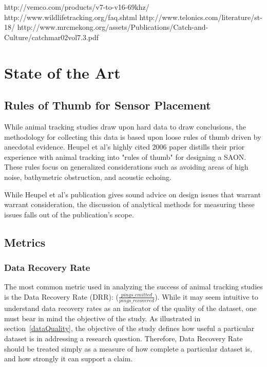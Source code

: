 http://vemco.com/products/v7-to-v16-69khz/
http://www.wildlifetracking.org/faq.shtml
http://www.telonics.com/literature/st-18/
http://www.mrcmekong.org/assets/Publications/Catch-and-Culture/catchmar02vol7.3.pdf










\section{State of the Art}

\subsection{Rules of Thumb for Sensor Placement}
\label{RulesOfThumb}
While animal tracking studies draw upon hard data to draw conclusions, the methodology for collecting this data is based upon loose rules of thumb driven by anecdotal evidence.  Heupel et al's highly cited 2006 paper distills their prior experience with animal tracking into "rules of thumb" for designing a SAON.  These rules focus on generalized considerations such as avoiding areas of high noise, bathymetric obstruction, and acoustic echoing\cite{Heupel2006}.  

While Heupel et al's publication gives sound advice on design issues that warrant warrant consideration, the discussion of analytical methods for measuring these issues falls out of the publication's scope.


\subsection{Metrics}
\subsubsection{Data Recovery Rate}
\label{DataRecoveryRate}
The most common metric used in analyzing the success of animal tracking studies is the Data Recovery Rate (DRR): ($\frac{pings\_emitted}{pings\_recovered}$).  While it may seem intuitive to understand data recovery rates as an indicator of the quality of the dataset, one must bear in mind the objective of the study.  As illustrated in section~\ref{dataQuality}, the objective of the study defines how useful a particular dataset is in addressing a research question.  Therefore, Data Recovery Rate should be treated simply as a measure of how complete a particular dataset is, and how strongly it can support a claim.  

